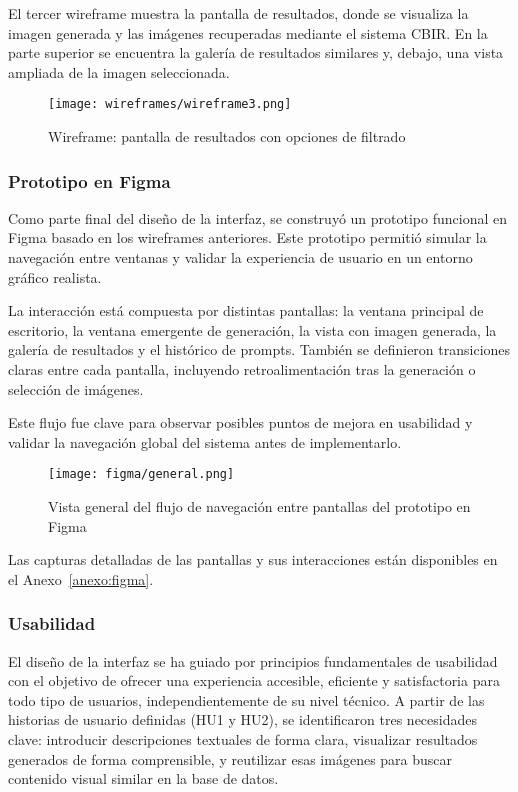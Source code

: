 El tercer wireframe muestra la pantalla de resultados, donde se visualiza la imagen generada y las imágenes recuperadas mediante el sistema CBIR. En la parte superior se encuentra la galería de resultados similares y, debajo, una vista ampliada de la imagen seleccionada.

\begin{figure}[H]
    \centering
    \texttt{[image: wireframes/wireframe3.png]}
    \caption{Wireframe: pantalla de resultados con opciones de filtrado}
    \label{fig:wireframe2}
\end{figure}

\subsubsection{Prototipo en Figma}

Como parte final del diseño de la interfaz, se construyó un prototipo funcional en Figma basado en los wireframes anteriores. Este prototipo permitió simular la navegación entre ventanas y validar la experiencia de usuario en un entorno gráfico realista.

La interacción está compuesta por distintas pantallas: la ventana principal de escritorio, la ventana emergente de generación, la vista con imagen generada, la galería de resultados y el histórico de prompts. También se definieron transiciones claras entre cada pantalla, incluyendo retroalimentación tras la generación o selección de imágenes. 

Este flujo fue clave para observar posibles puntos de mejora en usabilidad y validar la navegación global del sistema antes de implementarlo.

\begin{figure}[H]
    \centering
    \texttt{[image: figma/general.png]}
    \caption{Vista general del flujo de navegación entre pantallas del prototipo en Figma}
    \label{fig:figma-prototype}
\end{figure}

Las capturas detalladas de las pantallas y sus interacciones están disponibles en el Anexo~\ref{anexo:figma}.

\subsubsection{Usabilidad}

El diseño de la interfaz se ha guiado por principios fundamentales de usabilidad con el objetivo de ofrecer una experiencia accesible, eficiente y satisfactoria para todo tipo de usuarios, independientemente de su nivel técnico. A partir de las historias de usuario definidas (HU1 y HU2), se identificaron tres necesidades clave: introducir descripciones textuales de forma clara, visualizar resultados generados de forma comprensible, y reutilizar esas imágenes para buscar contenido visual similar en la base de datos.

